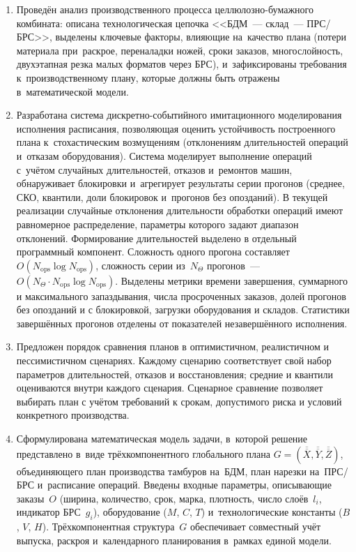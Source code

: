 \begin{enumerate}
  \item Проведён анализ производственного процесса целлюлозно-бумажного комбината: описана технологическая цепочка <<БДМ~--- склад~--- ПРС/БРС>>, выделены ключевые факторы, влияющие на~качество плана (потери материала при~раскрое, переналадки ножей, сроки заказов, многослойность, двухэтапная резка малых форматов через БРС), и~зафиксированы требования к~производственному плану, которые должны быть отражены в~математической модели.

  \item Разработана система дискретно-событийного имитационного моделирования исполнения расписания, позволяющая оценить устойчивость построенного плана к~стохастическим возмущениям (отклонениям длительностей операций и~отказам оборудования).
  Система моделирует выполнение операций с~учётом случайных длительностей, отказов и~ремонтов машин, обнаруживает блокировки и~агрегирует результаты серии прогонов (среднее, СКО, квантили, доли блокировок и~прогонов без опозданий). В текущей реализации случайные отклонения длительности обработки операций имеют равномерное распределение, параметры которого задают диапазон отклонений. Формирование длительностей выделено в отдельный программный компонент. Сложность одного прогона составляет $O(N_{\mathrm{ops}}\log N_{\mathrm{ops}})$, сложность серии из~$N_{\Theta}$ прогонов~--- $O(N_{\Theta}\cdot N_{\mathrm{ops}}\log N_{\mathrm{ops}})$.
  Выделены метрики времени завершения, суммарного и максимального запаздывания, числа просроченных заказов, долей прогонов без опозданий и с блокировкой, загрузки оборудования и складов. Статистики завершённых прогонов отделены от показателей незавершённого исполнения.

  \item Предложен порядок сравнения планов в оптимистичном, реалистичном и пессимистичном сценариях. Каждому сценарию соответствует свой набор параметров длительностей, отказов и восстановления; средние и квантили оцениваются внутри каждого сценария. Сценарное сравнение позволяет выбирать план с учётом требований к срокам, допустимого риска и условий конкретного производства.

  \item Сформулирована математическая модель задачи, в~которой решение представлено в~виде трёхкомпонентного глобального плана $G=(\overline{\overline{X}},\overline{\overline{Y}},\overline{\overline{Z}})$, объединяющего план производства тамбуров на~БДМ, план нарезки на~ПРС/БРС и~расписание операций.
  Введены входные параметры, описывающие заказы~$O$ (ширина, количество, срок, марка, плотность, число слоёв~$l_i$, индикатор БРС~$g_i$), оборудование ($M$, $C$, $T$) и~технологические константы ($B$, $V$, $H$).
  Трёхкомпонентная структура~$G$ обеспечивает совместный учёт выпуска, раскроя и~календарного планирования в~рамках единой модели.


\end{enumerate}
